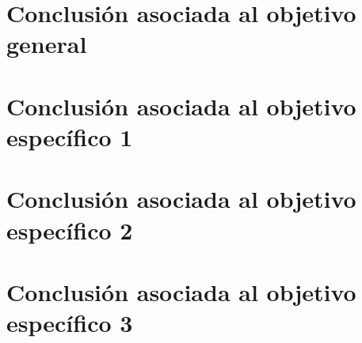 
\section{Conclusión asociada al objetivo general}



\section{Conclusión asociada al objetivo específico 1}



\section{Conclusión asociada al objetivo específico 2}



\section{Conclusión asociada al objetivo específico 3}

